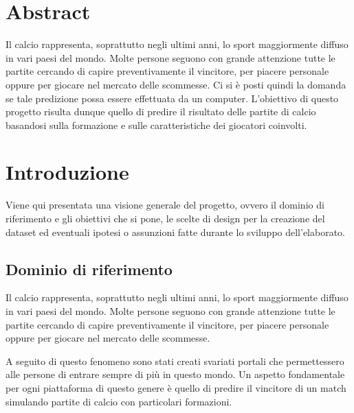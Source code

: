 \documentclass[hidelinks, 12pt]{article}
\begin{document}

\tableofcontents
\pagebreak




\section{Abstract}

Il calcio rappresenta, soprattutto negli ultimi anni, lo sport maggiormente diffuso in vari paesi del mondo. Molte persone seguono con grande attenzione tutte le partite cercando di capire preventivamente il vincitore, per piacere personale oppure per giocare nel mercato delle scommesse. Ci si è posti quindi la domanda se tale predizione possa essere effettuata da un computer. L'obiettivo di questo progetto risulta dunque quello di predire il risultato delle partite di calcio basandosi sulla formazione e sulle caratteristiche dei giocatori coinvolti.




\section{Introduzione}

Viene qui presentata una visione generale del progetto, ovvero il dominio di riferimento e gli obiettivi che si pone, le scelte di design per la creazione del dataset ed eventuali ipotesi o assunzioni fatte durante lo sviluppo dell'elaborato.



\subsection{Dominio di riferimento}

Il calcio rappresenta, soprattutto negli ultimi anni, lo sport maggiormente diffuso in vari paesi del mondo. Molte persone seguono con grande attenzione tutte le partite cercando di capire preventivamente il vincitore, per piacere personale oppure per giocare nel mercato delle scommesse.

A seguito di questo fenomeno sono stati creati svariati portali che permettessero alle persone di entrare sempre di più in questo mondo. Un aspetto fondamentale per ogni piattaforma di questo genere è quello di predire il vincitore di un match simulando partite di calcio con particolari formazioni.
\end{document}
